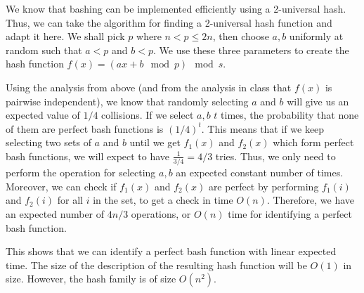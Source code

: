 \documentclass[psamsfonts]{amsart}
\newenvironment{sol}{\vspace{0.25cm}{\large \bfseries Solution:}}{\qedsymbol}
\begin{document}
\begin{sol}
We know that bashing can be implemented efficiently using a 2-universal hash. Thus, we can take the algorithm for finding a 2-universal hash function and adapt it here. We shall pick $p$ where $n < p \leq 2n$, then choose $a,b$ uniformly at random such that $a < p$ and $b<p$. We use these three parameters to create the hash function $f(x) = (ax + b \mod{p}) \mod{s}$. 

Using the analysis from above (and from the analysis in class that $f(x)$ is pairwise independent), we know that randomly selecting $a$ and $b$ will give us an expected value of $1/4$ collisions. If we select $a,b$ $t$ times, the probability that none of them are perfect bash functions is $(1/4)^t$. This means that if we keep selecting two sets of $a$ and $b$ until we get $f_1(x)$ and $f_2(x)$ which form perfect bash functions, we will expect to have $\frac{1}{3/4} = 4/3$ tries. Thus, we only need to perform the operation for selecting $a,b$ an expected constant number of times. Moreover, we can check if $f_1(x)$ and $f_2(x)$ are perfect by performing $f_1(i)$ and $f_2(i)$ for all $i$ in the set, to get a check in time $O(n)$. Therefore, we have an expected number of $4n/3$ operations, or $O(n)$ time for identifying a perfect bash function.

This shows that we can identify a perfect bash function with linear expected time. The size of the description of the resulting hash function will be $O(1)$ in size. However, the hash family is of size $O(n^2)$. 
\end{sol}
\end{document}
